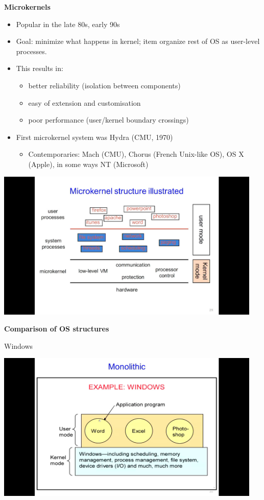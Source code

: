 \documentclass[11pt,a4paper]{article}
\begin{document}
\textbf{Microkernels}
\begin{itemize}
    \item Popular in the late 80s, early 90s
    \item Goal:
        minimize what happens in kernel;
        item organize rest of OS as user-level processes.
    \item This results in:
        \begin{itemize}
            \item better reliability (isolation between components)
            \item easy of extension and customisation
            \item poor performance (user/kernel boundary crossings)
        \end{itemize}
    \item First microkernel system was Hydra (CMU, 1970)
        \begin{itemize}
            \item Contemporaries: Mach (CMU), Chorus (French Unix-like OS), OS X (Apple),
                in some ways NT (Microsoft)
        \end{itemize}
\end{itemize}

\begin{center}{}
    \includegraphics[height=270]{microkernel-structure-illustrated.jpg}
\end{center}

\textbf{Comparison of OS structures}

Windows

\includegraphics[height=270]{windows.jpg}
\end{document}
